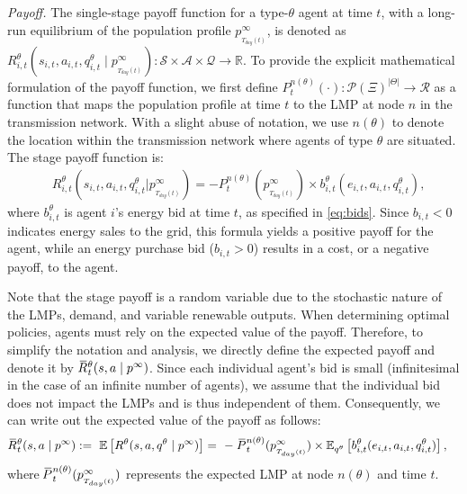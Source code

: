 \documentclass{article}
\theoremstyle{definition}
\theoremstyle{plain}
\newcommand{\overbar}[1]{\mkern1.5mu\overline{\mkern-3.0mu#1\mkern-1mu}\mkern 1.5mu}
\begin{document}
\textit{Payoff.} The single-stage payoff function for a type-\(\theta\) agent at time \(t\), with a long-run equilibrium of the population profile $p^{\infty}_{_{T_{day}(t)}}$, is denoted as \(R_{i,t}^{\theta}(s_{i,t}, a_{i,t}, q^{\theta}_{i,t} \mid p^{\infty}_{_{T_{day}(t)}}): \mathcal{S} \times \mathcal{A} \times \mathcal{Q} \rightarrow \mathbb{R}\).
To provide the explicit mathematical formulation of the payoff function, we first define $P^{n(\theta)}_t(\cdot): \mathcal{P}(\Xi)^{|\Theta|} \to \mathcal{R}$ as a function that maps the population profile at time $t$ to the LMP at node $n$ in the transmission network. With a slight abuse of notation, we use $n(\theta)$ to denote the location within the transmission network where agents of type $\theta$ are situated. 
The stage payoff function is:
\begin{align} 
& R^{\theta}_{i,t}(s_{i,t}, a_{i,t}, q^{\theta}_{i,t}|p^{\infty}_{_{T_{day}(t)}}) =  - P^{n(\theta)}_t(p^{\infty}_{_{T_{day}(t)}}) \times b^{\theta}_{i,t}(e_{i,t}, a_{i,t}, q^{\theta}_{i,t}), \label{eq:StagePayff} 
\end{align}
where $b^{\theta}_{i,t}$ is agent $i$'s energy bid at time $t$, as specified in \eqref{eq:bids}. Since $b_{i,t} < 0$ indicates energy sales to the grid, this formula yields a positive payoff for the agent, while an energy purchase bid ($b_{i,t} > 0$) results in a cost, or a negative payoff, to the agent. 

Note that the stage payoff is a random variable due to the stochastic nature of the LMPs, demand, and variable renewable outputs. When determining optimal policies, agents must rely on the expected value of the payoff. Therefore, to simplify the notation and analysis, we directly define the expected payoff and denote it by \( \overbar{R}^{\theta}_t(s, a \mid p^{\infty}) \). Since each individual agent's bid is small (infinitesimal in the case of an infinite number of agents), we assume that the individual bid does not impact the LMPs and is thus independent of them. Consequently, we can write out the expected value of the payoff as follows:
\begin{align}
& \overbar{R}^{\theta}_t(s, a \mid p^{\infty}) :=  \ \mathbb{E} \left[ R^{\theta}(s, a, q^{\theta} \mid p^{\infty}) \right] \label{eq:EPayoff}  = \ - \ \overbar{P}^{n(\theta)}_t(p^{\infty}_{_{T_{day}(t)}}) \times \mathbb{E}_{q^{\theta}} \left[ b^{\theta}_{i,t}(e_{i,t}, a_{i,t}, q^{\theta}_{i,t}) \right], 
\end{align}
where \( \overbar{P}^{n(\theta)}_t(p^{\infty}_{_{T_{day}(t)}}) \) represents the expected LMP at node $n(\theta)$ and time $t$.\\[-10pt] 
\end{document}

